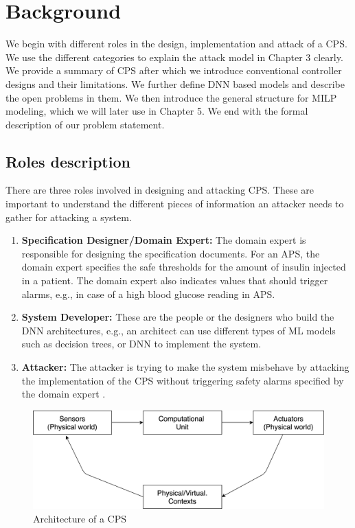\chapter{Background}
\label{background}

We begin with different roles in the design, implementation and attack of a \ac{CPS}. We use the different categories to explain the attack model in Chapter 3 clearly. 
We provide a summary of \ac{CPS} after which we introduce conventional controller designs and their limitations. 
We further define \ac{DNN} based models and describe the open problems in them. 
We then introduce the  general structure for \ac{MILP} modeling, which we will later use in Chapter 5. 
We end with the formal description of our problem statement.

\section{Roles description}
There are three roles involved in designing and attacking \ac{CPS}. These are important to understand the different pieces of information an attacker needs to gather for attacking a system.

\begin{enumerate}
	\item \textbf{Specification Designer/Domain Expert:} The domain expert is responsible for designing the specification documents. 
	For an \ac{APS}, the domain expert specifies the safe thresholds for the amount of insulin injected in a patient. The domain expert also indicates values that should trigger alarms, e.g., in case of a high blood glucose reading in \ac{APS}.
	\item \textbf{System Developer:} These are the people or the designers who
	build the \ac{DNN} architectures, e.g., an architect can use different types of \ac{ML} models such as decision trees, or \ac{DNN} to implement the system.
	\item \textbf{Attacker:} The attacker is trying to make the system misbehave by attacking the implementation of the \ac{CPS} without triggering safety alarms specified by the domain expert . 
\end{enumerate}

\begin{figure}
	\centering
	\includegraphics[width=0.7\linewidth]{Images/Systemsdescription}
	\caption{Architecture of a CPS}
	\label{fig:systemsdescription}
\end{figure}

